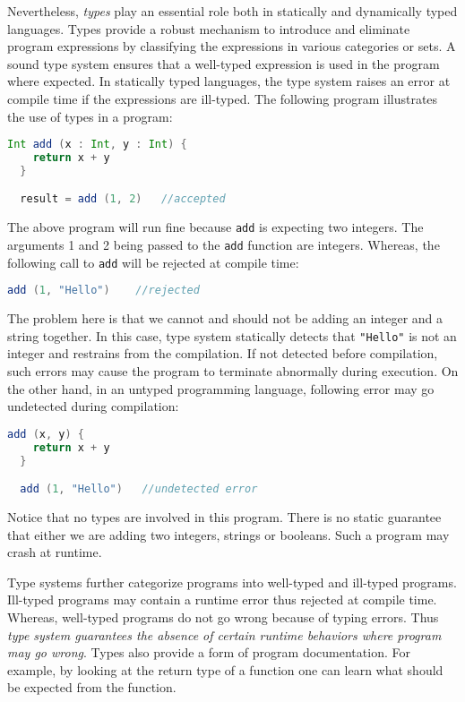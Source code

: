 Nevertheless, \emph{types} play an essential role both in 
statically and dynamically typed languages.
Types provide a robust mechanism to introduce 
and eliminate program expressions by classifying 
the expressions in various categories or sets.
A sound type system ensures that a well-typed
expression is used in the program where expected.
In statically typed languages, the type system 
raises an error at compile time 
if the expressions are ill-typed.
The following program illustrates the use of
types in a program:

\begin{lstlisting}[language=Scala]
  Int add (x : Int, y : Int) {
    return x + y
  }

  result = add (1, 2)   //accepted
\end{lstlisting}


\noindent The above program will run fine because 
\lstinline{add} is 
expecting two integers. The arguments 1 and 2 being 
passed to the \lstinline{add} function are integers.
Whereas, the following
call to \lstinline{add} will be rejected at compile time:

\begin{lstlisting}[language=Scala]
  add (1, "Hello")    //rejected
\end{lstlisting}

\noindent The problem here is that we cannot and should not be adding an
integer and a string together. In this case, type system statically
detects that \lstinline{"Hello"} is not an integer and restrains from the
compilation. If not detected before compilation, such errors may
cause the program to terminate abnormally during execution.
On the other hand, in an untyped programming language, following error may go undetected
during compilation:

\begin{lstlisting}[language=Scala]
  add (x, y) {
    return x + y
  }

  add (1, "Hello")   //undetected error
\end{lstlisting}

\noindent Notice that no types are involved in this program. There is no
static guarantee that either we are adding two integers, strings or
booleans. Such a program may crash at runtime.


Type systems further categorize programs into
well-typed and ill-typed programs. Ill-typed programs 
may contain a runtime error thus rejected at compile time.
Whereas, well-typed programs do not go wrong because of
typing errors.
Thus \emph{type system guarantees the absence of certain 
runtime behaviors where program may go wrong}.
Types also provide a form of program documentation.
For example, by looking at the return type of a 
function one can learn what should be
expected from the function.

